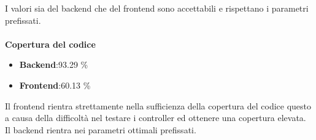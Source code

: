 I valori sia del backend che del frontend sono accettabili e rispettano i parametri prefissati.
\\\\
\textbf{Copertura del codice}
\begin{itemize}
\item \textbf{Backend}:93.29 \%
\item \textbf{Frontend}:60.13 \%
\end{itemize}
Il frontend rientra strettamente nella sufficienza della copertura del codice questo a causa della difficoltà nel testare i controller ed ottenere una copertura elevata.\\
Il backend rientra nei parametri ottimali prefissati.